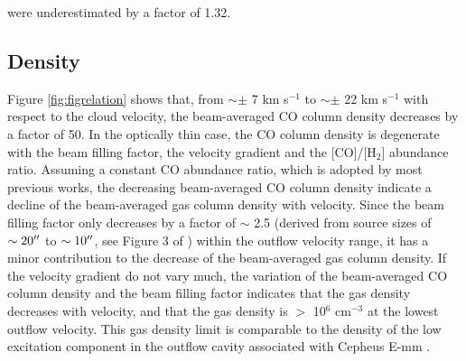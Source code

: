 \citet{2009ApJ...696...66Q} were underestimated by a factor of 1.32. 


\subsection{Density}\label{subsec:density}
Figure \ref{fig:figrelation} shows that, from $\sim \pm$ 7 km s$^{-1}$ to $\sim \pm$ 22 km s$^{-1}$ with respect to the cloud velocity, the beam-averaged CO column density decreases by a factor of 50. In the optically thin case, the CO column density is degenerate with the beam filling factor, the velocity gradient and the [CO]/[H$_2$] abundance ratio. Assuming a constant CO abundance ratio, which is adopted by most previous works, the decreasing beam-averaged CO column density indicate a decline of the beam-averaged gas column density with velocity. Since the beam filling factor only decreases by a factor of $\sim$ 2.5 (derived from source sizes of $\sim 20\mbox{$^{\prime\prime}$}$ to $\sim 10\mbox{$^{\prime\prime}$}$, see Figure 3 of \citet{2009ApJ...696...66Q}) within the outflow velocity range, it has a minor contribution to the decrease of the beam-averaged gas column density. If the velocity gradient do not vary much, the variation of the beam-averaged CO column density and the beam filling factor indicates that the gas density decreases with velocity, and that the gas density is $>$ 10$^6$ cm$^{-3}$ at the lowest outflow velocity. This gas density limit is comparable to the density of the low excitation component in the outflow cavity associated with Cepheus E-mm \citep[Several times of 10$^5$ cm$^{-3}$:][]{2015A&A...581A...4L}.

